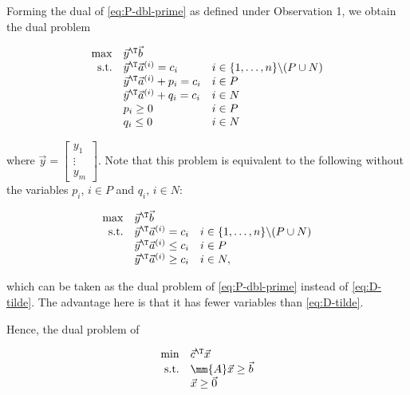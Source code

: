 Forming the dual of \eqref{eq:P-dbl-prime} as defined under Observation 1,
we obtain the dual problem

\begin{equation}
\begin{array}{rll}
\max & \vec{y}^\T\vec{b} \\
\mbox{s.t.} & 
 \vec{y}^\T\vec{a}^{(i)} = c_i & i \in \{1,\ldots,n\}\backslash 
(P\cup N) \\
&\vec{y}^\T\vec{a}^{(i)} + p_i = c_i & i \in P \\
& \vec{y}^\T\vec{a}^{(i)} + q_i = c_i & i \in N \\
& p_i \geq 0 & i \in P \\
& q_i \leq 0 & i \in N \\
\end{array} \label{eq:D-tilde}
\end{equation}

where \(\vec{y} = \begin{bmatrix} y_1\\ \vdots \\ y_m\end{bmatrix}\).
Note that this problem is equivalent to the following without the
variables \(p_i\), \(i \in P\) and \(q_i\), \(i \in N\):

\begin{equation}
\begin{array}{rll}
\max & \vec{y}^\T\vec{b} \\
\mbox{s.t.} & 
 \vec{y}^\T\vec{a}^{(i)} = c_i & i \in \{1,\ldots,n\}\backslash 
(P\cup N) \\
&\vec{y}^\T\vec{a}^{(i)} \leq c_i & i \in P      \\
& \vec{y}^\T\vec{a}^{(i)} \geq c_i & i \in N,     \\
\end{array}
\end{equation}

which can be taken as the dual problem of \eqref{eq:P-dbl-prime} instead
of \eqref{eq:D-tilde}. The advantage here is that it has fewer variables
than \eqref{eq:D-tilde}.

Hence, the dual problem of

\begin{equation*}
\begin{array}{rl}
\min & \vec{c}^\T\vec{x}  \\
\mbox{s.t.} & \mm{A}\vec{x} \geq \vec{b} \\
& \vec{x} \geq \vec{0}
\end{array}
\end{equation*}

